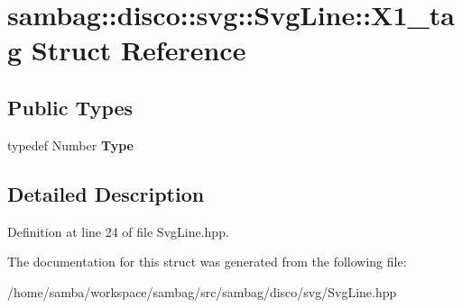 \hypertarget{structsambag_1_1disco_1_1svg_1_1_svg_line_1_1_x1__tag}{
\section{sambag::disco::svg::SvgLine::X1\_\-tag Struct Reference}
\label{structsambag_1_1disco_1_1svg_1_1_svg_line_1_1_x1__tag}
}
\subsection*{Public Types}
\begin{DoxyCompactItemize}
\item 
\hypertarget{structsambag_1_1disco_1_1svg_1_1_svg_line_1_1_x1__tag_a3653fb8d3e6f0e3d049062920d3e7d25}{
typedef Number {\bfseries Type}}
\label{structsambag_1_1disco_1_1svg_1_1_svg_line_1_1_x1__tag_a3653fb8d3e6f0e3d049062920d3e7d25}

\end{DoxyCompactItemize}


\subsection{Detailed Description}


Definition at line 24 of file SvgLine.hpp.



The documentation for this struct was generated from the following file:\begin{DoxyCompactItemize}
\item 
/home/samba/workspace/sambag/src/sambag/disco/svg/SvgLine.hpp\end{DoxyCompactItemize}
